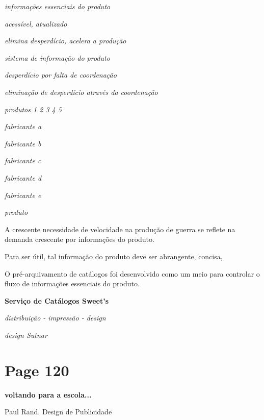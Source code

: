 \documentclass[a4paper]{article}
\begin{document}
\noindent\textit{informações essenciais do produto}
\par
\noindent\textit{acessível, atualizado}
\par
\noindent\textit{elimina desperdício, acelera a produção}
\par
\vspace{0.5em}
\noindent\textit{sistema de informação do produto}
\par
\vspace{0.5em}
\noindent\textit{desperdício por falta de coordenação}
\par
\noindent\textit{eliminação de desperdício através da coordenação}
\par
\vspace{0.5em}
\noindent\textit{produtos 1 2 3 4 5}
\par
\noindent\textit{fabricante a}
\par
\noindent\textit{fabricante b}
\par
\noindent\textit{fabricante c}
\par
\noindent\textit{fabricante d}
\par
\noindent\textit{fabricante e}
\par
\noindent\textit{produto}
\par
\vspace{0.5em}
A crescente necessidade de velocidade na produção de guerra se reflete na demanda crescente por informações do produto.
\par
Para ser útil, tal informação do produto deve ser abrangente, concisa,
\par
O pré-arquivamento de catálogos foi desenvolvido como um meio para controlar o fluxo de informações essenciais do produto.
\par
\vspace{0.5em}
\noindent\textbf{Serviço de Catálogos Sweet's}
\par
\noindent\textit{distribuição - impressão - design}
\par
\vspace{0.5em}
\noindent\textit{design Sutnar}
\par

\newpage
\section*{Page 120}

\raggedright
\textbf{voltando para a escola...}

Paul Rand. Design de Publicidade
\end{document}
